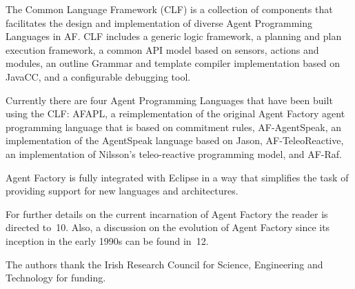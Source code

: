 \documentclass[preprint]{sigplanconf} %
\begin{document}
The Common Language Framework (CLF) is a collection of components that
facilitates the design and implementation of diverse Agent Programming
Languages in AF. CLF includes a generic logic framework, a planning and
plan execution framework, a common API model based on sensors, actions and
modules, an outline Grammar and template compiler implementation based on
JavaCC, and a configurable debugging tool.

Currently there are four Agent Programming Languages that have been built
using the CLF: AFAPL, a reimplementation of the original Agent Factory
agent programming language that is based on commitment rules,
AF-AgentSpeak, an implementation of the AgentSpeak language based on
Jason, AF-TeleoReactive, an implementation of Nilsson's teleo-reactive
programming model, and AF-Raf.

Agent Factory is fully integrated with Eclipse in a way that simplifies
the task of providing support for new languages and architectures.

For further details on the current incarnation of Agent Factory the reader
is directed to~\cite{}10. Also, a discussion on the evolution of Agent
Factory since its inception in the early 1990s can be found in~\cite{}12.

\acks

The authors thank the Irish Research Council for Science, Engineering and
Technology for funding.




\end{document}
